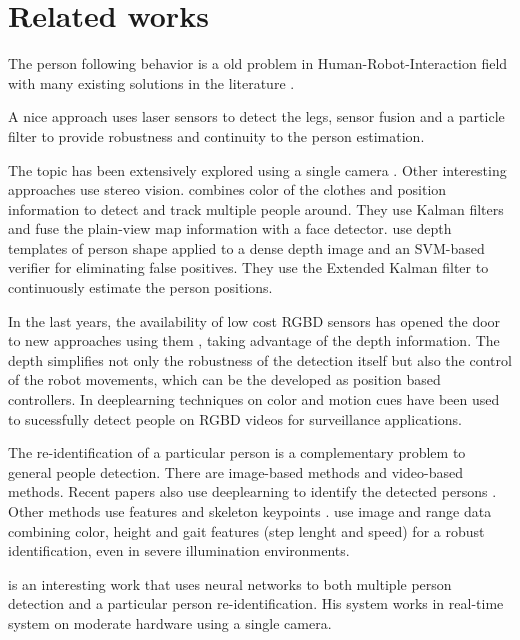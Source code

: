 \section{Related works}

The person following behavior is a old problem in Human-Robot-Interaction field with many existing solutions in the literature \cite{sidenbladh1999person,rocapal2005,yoshimi2006development}. 

A nice approach \cite{aguirre2016multisensor} uses laser sensors to detect the legs, sensor fusion and a particle filter to provide robustness and continuity to the person estimation. 

The topic has been extensively explored using a single camera \cite{yoshimi2006development}. Other interesting approaches use stereo vision. \cite{munoz2007people} combines color of the clothes and position information to detect and track multiple people around. They use Kalman filters and fuse the plain-view map information with a face detector. \cite{satake2009robust} use depth templates of person shape applied to a dense depth image and an SVM-based verifier for eliminating false positives. They use the Extended Kalman filter to continuously estimate the person positions.

In the last years, the availability of low cost RGBD sensors has opened the door to new approaches using them \cite{ilias2014nurse,shimura2014research}, taking advantage of the depth information. The depth simplifies not only the robustness of the detection itself but also the control of the robot movements, which can be the developed as position based controllers. In \cite{xue2016tracking} deeplearning techniques on color and motion cues have been used to sucessfully detect people on RGBD videos for surveillance applications.

The re-identification of a particular person is a complementary problem to general people detection. There are image-based methods and video-based methods. Recent papers also use deeplearning to identify the detected persons \cite{yoon2016person}. Other methods use features and skeleton keypoints \cite{munaro2014feature}. \cite{koide2016identification} use image and range data combining color, height and gait features (step lenght and speed) for a robust identification, even in severe illumination environments.

\cite{welsh2017real} is an interesting work that uses neural networks to both multiple person detection and a particular person re-identification. His system works in real-time system on moderate hardware using a single camera. 

